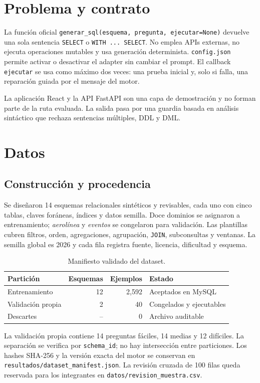 \documentclass[10pt,letterpaper]{article}
\newcommand{\code}[1]{\texttt{#1}}
\begin{document}
\section{Problema y contrato}
La función oficial \code{generar\_sql(esquema, pregunta, ejecutar=None)} devuelve una sola sentencia \code{SELECT} o \code{WITH ... SELECT}. No emplea APIs externas, no ejecuta operaciones mutables y usa generación determinista. \code{config.json} permite activar o desactivar el adapter sin cambiar el prompt. El callback \code{ejecutar} se usa como máximo dos veces: una prueba inicial y, solo si falla, una reparación guiada por el mensaje del motor.

La aplicación React y la API FastAPI son una capa de demostración y no forman parte de la ruta evaluada. La salida pasa por una guardia basada en análisis sintáctico que rechaza sentencias múltiples, DDL y DML.

\section{Datos}
\subsection{Construcción y procedencia}
Se diseñaron 14 esquemas relacionales sintéticos y revisables, cada uno con cinco tablas, claves foráneas, índices y datos semilla. Doce dominios se asignaron a entrenamiento; \emph{aerolínea} y \emph{eventos} se congelaron para validación. Las plantillas cubren filtros, orden, agregaciones, agrupación, \code{JOIN}, subconsultas y ventanas. La semilla global es 2026 y cada fila registra fuente, licencia, dificultad y esquema.

\begin{table}[H]\centering\caption{Manifiesto validado del dataset.}
\begin{tabular}{@{}lrrl@{}}\toprule Partición&Esquemas&Ejemplos&Estado\\\midrule Entrenamiento&12&2,592&Aceptados en MySQL\\Validación propia&2&40&Congelados y ejecutables\\Descartes&--&0&Archivo auditable\\\bottomrule\end{tabular}\end{table}

La validación propia contiene 14 preguntas fáciles, 14 medias y 12 difíciles. La separación se verifica por \code{schema\_id}; no hay intersección entre particiones. Los hashes SHA-256 y la versión exacta del motor se conservan en \code{resultados/dataset\_manifest.json}. La revisión cruzada de 100 filas queda reservada para los integrantes en \code{datos/revision\_muestra.csv}.
\end{document}

